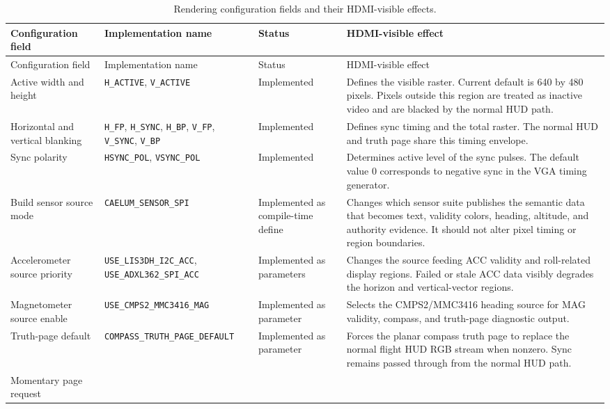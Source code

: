 \documentclass[letterpaper, final, onecolumn, titlepage]{article}
\DeclareRobustCommand{\sig}[1]{\nolinkurl{#1}}
\begin{document}
\begin{longtable}{L{0.21\textwidth} L{0.24\textwidth} L{0.16\textwidth} L{0.30\textwidth}}
\caption{Rendering configuration fields and their HDMI-visible effects.}
\label{tab:config-fields}\\
\toprule
Configuration field & Implementation name & Status & HDMI-visible effect \\
\midrule
\endfirsthead
\toprule
Configuration field & Implementation name & Status & HDMI-visible effect \\
\midrule
\endhead
Active width and height &
\sig{H_ACTIVE}, \sig{V_ACTIVE} &
Implemented &
Defines the visible raster. Current default is 640 by 480 pixels. Pixels outside this region are treated as inactive video and are blacked by the normal HUD path. \\
\addlinespace
Horizontal and vertical blanking &
\sig{H_FP}, \sig{H_SYNC}, \sig{H_BP}, \sig{V_FP}, \sig{V_SYNC}, \sig{V_BP} &
Implemented &
Defines sync timing and the total raster. The normal HUD and truth page share this timing envelope. \\
\addlinespace
Sync polarity &
\sig{HSYNC_POL}, \sig{VSYNC_POL} &
Implemented &
Determines active level of the sync pulses. The default value 0 corresponds to negative sync in the VGA timing generator. \\
\addlinespace
Build sensor source mode &
\sig{CAELUM_SENSOR_SPI} &
Implemented as compile-time define &
Changes which sensor suite publishes the semantic data that becomes text, validity colors, heading, altitude, and authority evidence. It should not alter pixel timing or region boundaries. \\
\addlinespace
Accelerometer source priority &
\sig{USE_LIS3DH_I2C_ACC}, \sig{USE_ADXL362_SPI_ACC} &
Implemented as parameters &
Changes the source feeding ACC validity and roll-related display regions. Failed or stale ACC data visibly degrades the horizon and vertical-vector regions. \\
\addlinespace
Magnetometer source enable &
\sig{USE_CMPS2_MMC3416_MAG} &
Implemented as parameter &
Selects the CMPS2/MMC3416 heading source for MAG validity, compass, and truth-page diagnostic output. \\
\addlinespace
Truth-page default &
\sig{COMPASS_TRUTH_PAGE_DEFAULT} &
Implemented as parameter &
Forces the planar compass truth page to replace the normal flight HUD RGB stream when nonzero. Sync remains passed through from the normal HUD path. \\
\addlinespace
Momentary page request &

\end{longtable}
\end{document}

